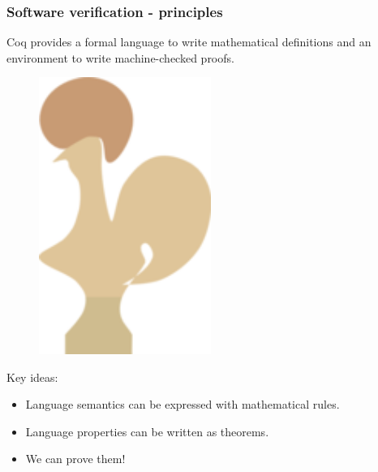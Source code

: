 \begin{frame}[fragile]
\frametitle{Software verification - principles}

\begin{minipage}{0.75\linewidth}
Coq provides a formal language to write mathematical definitions and an environment to write machine-checked proofs.
\end{minipage}%
\begin{minipage}{0.2\linewidth}
\begin{figure}
	\centering
	\includegraphics[width=0.5\textwidth]{images/coq}
\end{figure}
\end{minipage}

\bigskip

Key ideas:
\begin{itemize}
	\item Language semantics can be expressed with mathematical rules.
	\item Language properties can be written as theorems.
	\item We can prove them!
\end{itemize}

\end{frame}


